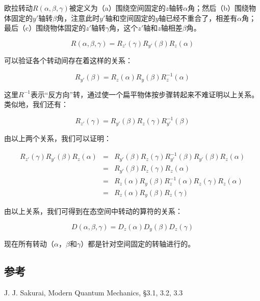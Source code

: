 欧拉转动$R(\alpha, \beta, \gamma)$被定义为（a）围绕空间固定的$z$轴转$\alpha$角；然后（b）围绕物体固定的$y'$轴转$\beta$角，注意此时$y'$轴和空间固定的$y$轴已经不重合了，相差有$\alpha$角；最后（c）围绕物体固定的$z'$轴转$\gamma$角，这个$z'$轴和$z$轴相差$\beta$角。

\begin{equation}
R(\alpha, \beta, \gamma) = R_{z'}(\gamma) R_{y'} (\beta) R_z (\alpha)
\end{equation}

可以验证各个转动间存在着这样的关系：

\begin{equation}
R_{y'}(\beta) = R_z (\alpha) R_y (\beta) R_z^{-1}(\alpha)
\end{equation}

这里$R^{-1}$表示“反方向”转，通过使一个扁平物体按步骤转起来不难证明以上关系。类似地，我们还有：

\begin{equation}
R_{z'}(\gamma) = R_{y'} (\beta) R_z (\gamma) R_{y'}^{-1}(\beta)
\end{equation}

由以上两个关系，我们可以证明：

\begin{eqnarray*}
R_{z'} (\gamma) R_{y'} (\beta) R_z (\alpha) & = &  R_{y'} (\beta) R_z (\gamma) R_{y'}^{-1}(\beta) R_{y'} (\beta) R_z (\alpha) \\
{} & = & R_{y'} (\beta) R_z (\gamma) R_z (\alpha) \\
{} & = & R_z (\alpha) R_y (\beta) R_z^{-1}(\alpha) R_z (\gamma) R_z (\alpha) \\
{} & = & R_z (\alpha) R_y (\beta) R_z (\gamma)
\end{eqnarray*}

由以上关系，我们可得到在态空间中转动的算符的关系：

\begin{equation}
D(\alpha, \beta, \gamma ) = D_z (\alpha) D_y (\beta) D_z (\gamma)
\end{equation}

现在所有转动（$\alpha$，$\beta$和$\gamma$）都是针对空间固定的转轴进行的。

\subsection*{参考}

J. J. Sakurai, Modern Quantum Mechanics, \S 3.1, 3.2, 3.3

